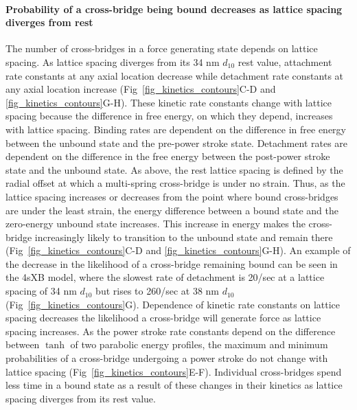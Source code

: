 \documentclass[10pt]{article}
\begin{document}
\paragraph{Probability of a cross-bridge being bound decreases as lattice spacing diverges from rest} %
The number of cross-bridges in a force generating state depends on lattice spacing. 
As lattice spacing diverges from its 34 nm $d_{10}$ rest value, attachment rate constants at any axial location decrease while detachment rate constants at any axial location increase (Fig~\ref{fig_kinetics_contours}C-D and \ref{fig_kinetics_contours}G-H). 
These kinetic rate constants change with lattice spacing because the difference in free energy, on which they depend, increases with lattice spacing.
Binding rates are dependent on the difference in free energy between the unbound state and the pre-power stroke state.  
Detachment rates are dependent on the difference in the free energy between the post-power stroke state and the unbound state.  
As above, the rest lattice spacing is defined by the radial offset at which a multi-spring cross-bridge is under no strain. 
Thus, as the lattice spacing increases or decreases from the point where bound cross-bridges are under the least strain, the energy difference between a bound state and the zero-energy unbound state increases. 
This increase in energy makes the cross-bridge increasingly likely to transition to the unbound state and remain there (Fig~\ref{fig_kinetics_contours}C-D and  \ref{fig_kinetics_contours}G-H). 
An example of the decrease in the likelihood of a cross-bridge remaining bound can be seen in the 4sXB model, where the slowest rate of detachment is 20/sec at a lattice spacing of 34 nm $d_{10}$ but rises to 260/sec at 38 nm $d_{10}$ (Fig~\ref{fig_kinetics_contours}G). 
Dependence of kinetic rate constants on lattice spacing decreases the likelihood a cross-bridge will generate force as lattice spacing increases.
As the power stroke rate constants depend on the difference between $\tanh$ of two parabolic energy profiles, the maximum and minimum probabilities of a cross-bridge undergoing a power stroke do not change with lattice spacing (Fig~\ref{fig_kinetics_contours}E-F). 
Individual cross-bridges spend less time in a bound state as a result of these changes in their kinetics as lattice spacing diverges from its rest value.
\end{document}
